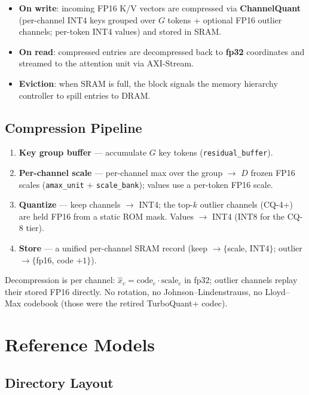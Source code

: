 \documentclass[11pt]{article}
\begin{document}
\begin{itemize}
\item \textbf{On write}: incoming FP16 K/V vectors are compressed via
      \textbf{ChannelQuant} (per-channel INT4 keys grouped over $G$ tokens
      + optional FP16 outlier channels; per-token INT4 values) and stored in SRAM.
\item \textbf{On read}: compressed entries are decompressed back to
      \textbf{fp32} coordinates and streamed to the attention unit via AXI-Stream.
\item \textbf{Eviction}: when SRAM is full, the block signals the memory
      hierarchy controller to spill entries to DRAM.
\end{itemize}

\subsection{Compression Pipeline}

\begin{enumerate}
\item \textbf{Key group buffer} --- accumulate $G$ key tokens
      (\texttt{residual\_buffer}).
\item \textbf{Per-channel scale} --- per-channel max over the group $\rightarrow$
      $D$ frozen FP16 scales (\texttt{amax\_unit} + \texttt{scale\_bank}); values
      use a per-token FP16 scale.
\item \textbf{Quantize} --- keep channels $\rightarrow$ INT4; the top-$k$ outlier
      channels (CQ-4+) are held FP16 from a static ROM mask. Values $\rightarrow$
      INT4 (INT8 for the CQ-8 tier).
\item \textbf{Store} --- a unified per-channel SRAM record (keep $\to\{$scale,
      INT4$\}$; outlier $\to\{$fp16, code $+1\}$).
\end{enumerate}

\noindent Decompression is per channel: $\hat{x}_c = \text{code}_c \cdot
\text{scale}_c$ in fp32; outlier channels replay their stored FP16 directly. No
rotation, no Johnson--Lindenstrauss, no Lloyd--Max codebook (those were the
retired TurboQuant+ codec).

\section{Reference Models}

\subsection{Directory Layout}
\end{document}
